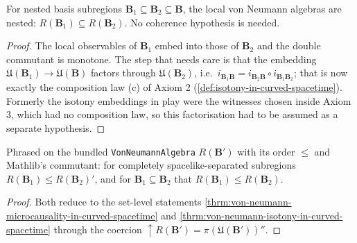 \begin{theorem}
    \label{thrm:von-neumann-isotony-in-curved-spacetime}
    \leanok
    For nested basis subregions $\mathbf{B}_1 \subseteq \mathbf{B}_2 \subseteq \mathbf{B}$, the local von Neumann algebras are nested: $R(\mathbf{B}_1) \subseteq R(\mathbf{B}_2)$. No coherence hypothesis is needed.
\end{theorem}
\begin{proof}
    \leanok
    The local observables of $\mathbf{B}_1$ embed into those of $\mathbf{B}_2$ and the double commutant is monotone. The step that needs care is that the embedding $\mathfrak{U}(\mathbf{B}_1) \to \mathfrak{U}(\mathbf{B})$ factors through $\mathfrak{U}(\mathbf{B}_2)$, i.e.\ $i_{\mathbf{B}_1\mathbf{B}} = i_{\mathbf{B}_2\mathbf{B}} \circ i_{\mathbf{B}_1\mathbf{B}_2}$; that is now exactly the composition law (c) of Axiom 2 (\ref{def:isotony-in-curved-spacetime}). Formerly the isotony embeddings in play were the witnesses chosen inside Axiom 3, which had no composition law, so this factorisation had to be assumed as a separate hypothesis.
\end{proof}

\begin{theorem}
    \label{thrm:von-neumann-bundled-order-in-curved-spacetime}
    \leanok
    Phrased on the bundled \texttt{VonNeumannAlgebra} $R(\mathbf{B}')$ with its order $\le$ and Mathlib's commutant: for completely spacelike-separated subregions $R(\mathbf{B}_1) \le R(\mathbf{B}_2)'$, and for $\mathbf{B}_1 \subseteq \mathbf{B}_2$ that $R(\mathbf{B}_1) \le R(\mathbf{B}_2)$.
\end{theorem}
\begin{proof}
    \leanok
    Both reduce to the set-level statements \ref{thrm:von-neumann-microcausality-in-curved-spacetime} and \ref{thrm:von-neumann-isotony-in-curved-spacetime} through the coercion $\uparrow R(\mathbf{B}') = \pi(\mathfrak{U}(\mathbf{B}'))''$.
\end{proof}


